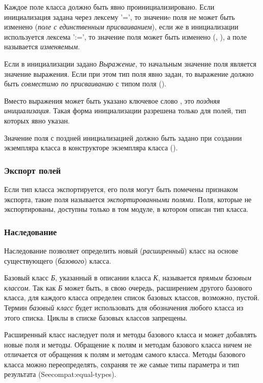 Каждое поле класса должно быть явно проинициализировано.
Если инициализация задана через лексему '=', то значениe поля не может быть изменено (\emph{поле с единственным присваиванием}), 
если же в инициализации используется лексема ':=', то значение поля может быть изменено  (, ), а поле называется \emph{изменяемым}.

Если в инициализации задано \emph{Выражение}, то начальным значение поля является значение выражения.
Если при этом тип поля явно задан, то выражение должно быть \emph{совместимо по присваиванию} с типом поля ().

Вместо выражения может быть указано ключевое слово , это \emph{поздняя инициализация}. 
Такая форма инициализации разрешена только для полей, тип которых явно указан.

Значение поля с поздней инициализацией должно быть задано при создании экземпляра класса в конструкторе экземпляра класса (). 

\hypertarget{exported-fields}{%
\subsubsection{Экспорт полей}\label{decls:exported-fields}}

Если тип класса экспортируется, его поля могут быть помечены признаком экспорта, такие поля называется \emph{экспортированными полями}.
Поля, которые не экспортированы, доступны только в том модуле, в котором описан тип класса.

\hypertarget{inheritance}{%
\subsubsection{Наследование}\label{decls:inheritance}}

Наследование позволяет определить новый (\emph{расширенный}) класс  на основе существующего (\emph{базового}) класса. 

Базовый класс \emph{Б}, указанный в описании класса \emph{К}, называется \emph{прямым базовым классом}. 
Так как \emph{Б} может быть, в свою очередь, расширением другого базового класса, для каждого класса определен список базовых классов, возможно, пустой.
Термин \emph{базовый класс} будет использовать для обозначения любого класса из этого списка. Циклы в списке базовых классов запрещены.

Расширенный класс наследует поля и методы базового класса и может добавлять новые поля и методы.
Обращение к полям и методам базового класса ничем не отличается от обращения к полям и методам самого класса. 
Методы базового класса можно переопределять, сохраняя те же самые типы параметра и тип результата (See{compat:equal-types}).

